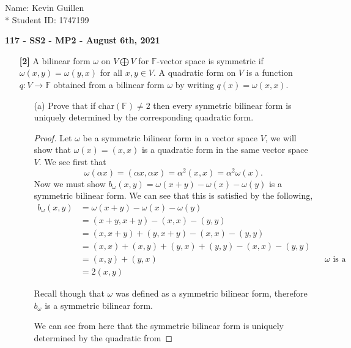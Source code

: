 \documentclass[12pt]{article}
\newcommand      {\Fm}          {{\mathbb F}}
\begin{document}
\begin{flushright}
    Name: Kevin Guillen \\*
    Student ID: 1747199
\end{flushright}
\begin{center}
    {\bf 117 - SS2 - MP2 - August 6th, 2021}
\end{center}

\begin{itemize}
    \item[\textbf{[2]}] A bilinear form $\omega$ on $V \bigoplus V $ for $\Fm$-vector space is symmetric if $\omega(x,y) = \omega(y,x)$ for all $x,y \in V$. A quadratic form on $V$ is a function $q:V\to \Fm$ obtained from a bilinear form $\omega$ by writing $q(x) = \omega(x,x)$.
    \begin{itemize}
        \item[(a)] Prove that if char$(\Fm)\neq 2$ then every synmetric bilinear form is uniquely determined by the corresponding quadratic form. 
        \begin{proof}
            Let $\omega$ be a symmetric bilinear form in a vector space $V$, we will show that $\omega(x) = (x,x)$ is a quadratic form in the same vector space $V$. We see first that \[\omega(\alpha x) = (\alpha x, \alpha x) = \alpha^2(x,x) = \alpha^2 \omega(x).\] Now we must show $b_\omega(x,y) = \omega(x+y) -\omega(x) - \omega(y)$ is a symmetric bilinear form. We can see that this is satisfied by the following,
            \begin{align*}
                b_\omega(x,y) &= \omega(x+y) - \omega(x) - \omega(y) \\
                &= (x+y, x+y) - (x,x) - (y,y) \\ 
                &= (x,x+y) + (y,x+y) - (x,x) - (y,y) \\
                &= (x,x) + (x,y) + (y,x) + (y,y) - (x,x) - (y,y) \\
                &= (x,y) + (y,x) && \text{$\omega$ is a symmetric bilinear form so,} \\
                &= 2(x,y)
            \end{align*}

            Recall though that $\omega$ was defined as a symmetric bilinear form, therefore $b_\omega$ is a symmetric bilinear form.
            
            We can see from here that the symmetric bilinear form is uniquely determined by the quadratic from 
        \end{proof}

    \end{itemize}

\end{itemize}
\end{document}
